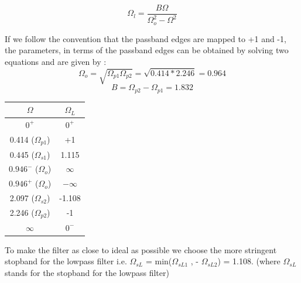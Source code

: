 \documentclass{article}
\begin{document}
\begin{equation*}
    \Omega_l = \frac{B\Omega}{ \Omega_o^2 - \Omega^2}
\end{equation*}

\vspace{1em}
\noindent
If we follow the convention that the passband edges are mapped to +1 and -1, the parameters, in terms of the passband edges can be obtained by solving two equations and are given by :
\begin{equation*}
    \Omega_o = \sqrt{\Omega_{p1} \Omega_{p2}} = \sqrt{0.414*2.246} = 0.964
\end{equation*}
\begin{equation*}
    B = \Omega_{p2}  - \Omega_{p1} = 1.832
\end{equation*}

\begin{table}[H]
		\begin{center}
		\begin{tabular}{|c|c|}
			\hline
			$\Omega$ & $\Omega_L$\\
			
			\hline
                $0^{+}$ & $0^{+}$\\
                \hline
                0.414 ($\Omega_{p1}$) & +1 \\
                \hline
                0.445 ($\Omega_{s1}$) & 1.115\\
                \hline
                $0.946^{-}$ ($\Omega_o$) & $\infty$\\
                \hline
                $0.946^{+}$ ($\Omega_o$) & $-\infty$\\
                \hline
                2.097 ($\Omega_{s2}$)  & -1.108\\
                \hline
                2.246 ($\Omega_{p2}$) & -1\\
                \hline
                $\infty$ & $0^{-}$\\
                \hline
            
		\end{tabular}
		\end{center}
\end{table}

\vspace{1em}
\noindent
To make the filter as close to ideal as possible we choose the more stringent stopband for the lowpass filter i.e. $\Omega_{sL}$ = min($\Omega_{sL1}$ , - $\Omega_{sL2}$) = 1.108. (where $\Omega_{sL}$ stands for the stopband for the lowpass filter)
\end{document}
